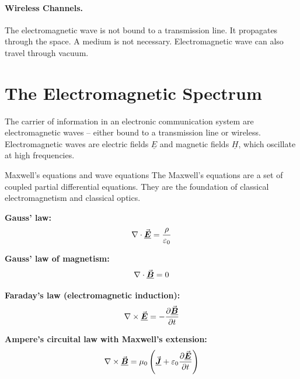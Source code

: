 \begin{refsection}
\paragraph{Wireless Channels.}

The electromagnetic wave is not bound to a transmission line. It propagates through the space. A medium is not necessary. Electromagnetic wave can also travel through vacuum.

\section{The Electromagnetic Spectrum}

The carrier of information in an electronic communication system are electromagnetic waves -- either bound to a transmission line or wireless. Electromagnetic waves are electric fields $\underline{E}$ and magnetic fields $\underline{H}$, which oscillate at high frequencies.

\begin{excursus}{Maxwell's equations and wave equations}
	The Maxwell's equations are a set of coupled partial differential equations. They are the foundation of classical electromagnetism and classical optics.
	
	\textbf{Gauss' law:}
	\begin{equation}
		\nabla \cdot \vec{\bm{\underline{E}}} = \frac{\rho}{\varepsilon_0}
	\end{equation}
	
	\textbf{Gauss' law of magnetism:}
	\begin{equation}
		\nabla \cdot \vec{\bm{\underline{B}}} = 0
	\end{equation}
	
	\textbf{Faraday's law (electromagnetic induction):}
	\begin{equation}
		\nabla \times \vec{\bm{\underline{E}}} = - \frac{\partial \vec{\bm{\underline{B}}}}{\partial t}
	\end{equation}
	
	\textbf{Ampere's circuital law with Maxwell's extension:}
	\begin{equation}
		\nabla \times \vec{\bm{\underline{B}}} = \mu_0 \left(\vec{\bm{\underline{J}}} + \varepsilon_0 \frac{\partial \vec{\bm{\underline{E}}}}{\partial t} \right)
	\end{equation}
	

\end{excursus}
\end{refsection}
